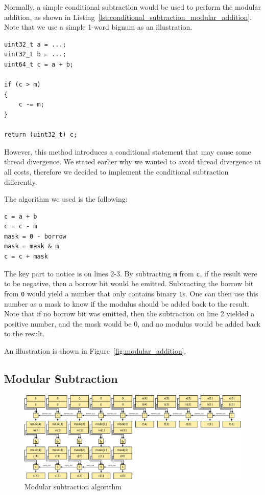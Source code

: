 \documentclass[10pt, a4paper]{report}
\begin{document}
Normally, a simple conditional subtraction would be used to perform the modular
addition, as shown in
Listing~\ref{lst:conditional_subtraction_modular_addition}.
Note that we use a simple 1-word bignum as an illustration.

\begin{lstlisting}
uint32_t a = ...;
uint32_t b = ...;
uint64_t c = a + b;

if (c > m)
{
    c -= m;
}

return (uint32_t) c;
\end{lstlisting}

However, this method introduces a conditional statement that may cause some
thread divergence.
We stated earlier why we wanted to avoid thread divergence at all costs,
therefore we decided to implement the conditional subtraction differently.

The algorithm we used is the following:
\begin{lstlisting}
c = a + b
c = c - m
mask = 0 - borrow
mask = mask & m
c = c + mask
\end{lstlisting}

The key part to notice is on lines 2-3.
By subtracting \verb+m+ from \verb+c+, if the result were to be negative, then
a borrow bit would be emitted.
Subtracting the borrow bit from \verb+0+ would yield a number that only contains
binary \verb+1+s.
One can then use this number as a mask to know if the modulus should be added
back to the result.
Note that if no borrow bit was emitted, then the subtraction on line 2 yielded a
positive number, and the mask would be 0, and no modulus would be added back to
the result.

An illustration is shown in Figure~\ref{fig:modular_addition}.

\subsection{Modular Subtraction}
\begin{figure}[h]
\centering
\includegraphics[width=\linewidth]{figs/modular_subtraction}
\caption{Modular subtraction algorithm}
\label{fig:modular_subtraction}
\end{figure}
\end{document}
